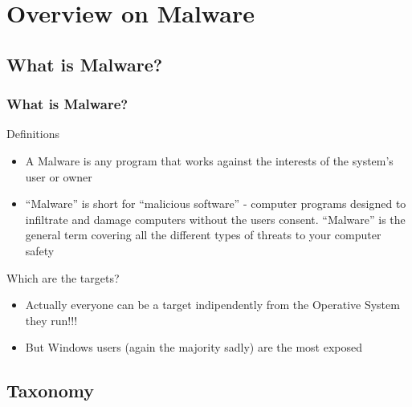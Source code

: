 \documentclass[]{beamer}
\begin{document}
\section {Overview on Malware}
	\subsection {What is Malware?}
	
		\begin{frame}
  			\frametitle{What is Malware?}   %

  			\begin{block}{Definitions}
				\begin{itemize}
 					\item { A Malware is any program that works against the interests of the system's user or owner}
  					\item { “Malware” is short for “malicious software” - computer programs designed to infiltrate and damage computers without the users consent. “Malware” is the general term covering all the different types of threats to your computer safety }
				\end{itemize}
  			\end{block}
			\begin{block}{Which are the targets?}
				\begin{itemize}
					\item {Actually everyone can be a target indipendently from the Operative System they run!!!}
					\item {But Windows users (again the majority sadly) are the most exposed }
				\end{itemize}
			\end{block} 
		\end{frame}
	\subsection {Taxonomy}
\end{document}
